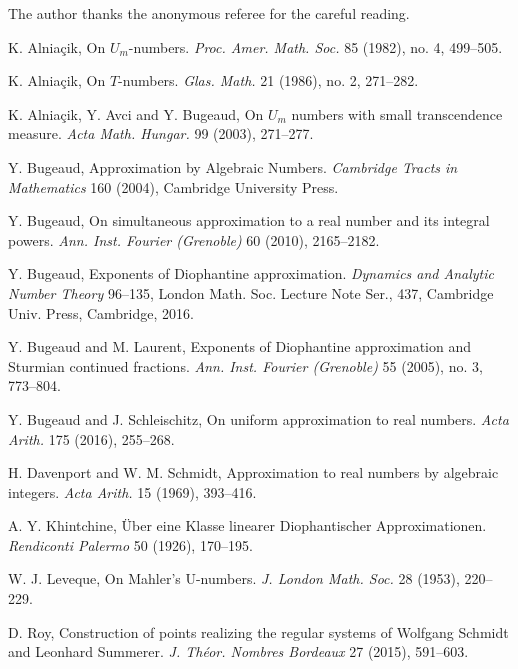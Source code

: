 \documentclass[12pt]{amsart}
\theoremstyle{definition}
\begin{document}
 \vspace{1cm}
 
 The author thanks the anonymous 
 referee for the 
 careful reading.




\begin{thebibliography}{99} 

 K. Alnia\c{c}ik, On $U_{m}$-numbers. {\em Proc. Amer. Math. Soc.} 85 (1982), no. 4, 499--505. 

 K. Alnia\c{c}ik, On $T$-numbers. {\em Glas. Math.} 21 (1986), no. 2, 271--282.

 K. Alnia\c{c}ik, Y. Avci and Y. Bugeaud, On $U_{m}$ numbers with small transcendence
measure. {\em Acta Math. Hungar.} 99 (2003), 271--277. 

 Y. Bugeaud, Approximation by Algebraic Numbers.
{\em Cambridge Tracts in Mathematics} 160 (2004), Cambridge University Press.

 Y. Bugeaud, On simultaneous approximation to a real number and its integral powers.
 {\em Ann. Inst. Fourier (Grenoble)} 60 (2010), 2165--2182.


 Y. Bugeaud, Exponents of Diophantine approximation.  
{\em Dynamics and Analytic Number Theory} 96--135, 
London Math. Soc. Lecture Note Ser., 437, Cambridge Univ. Press, Cambridge, 2016. 



 Y. Bugeaud and M. Laurent, Exponents of Diophantine approximation
and Sturmian continued fractions. {\em Ann. Inst. Fourier (Grenoble)} 55 (2005), no. 3, 773--804.

 Y. Bugeaud and J. Schleischitz, On uniform approximation to real numbers.
{\em Acta Arith.} 175 (2016), 255--268. 


 H. Davenport and W. M. Schmidt, 
Approximation to real numbers by algebraic integers. {\em Acta Arith.} 15 (1969), 393--416.


 A. Y. Khintchine, \"Uber eine Klasse linearer Diophantischer Approximationen.
{\em Rendiconti Palermo} 50 (1926), 170--195.

W. J. Leveque, On Mahler's U-numbers. {\em J. London Math. Soc.} 28 (1953), 220--229.


 D. Roy,  Construction of points realizing the regular systems of Wolfgang Schmidt and Leonhard Summerer. 
{\em J. Th\'eor. Nombres Bordeaux} 27 (2015), 591--603. 


\end{thebibliography}
\end{document}

